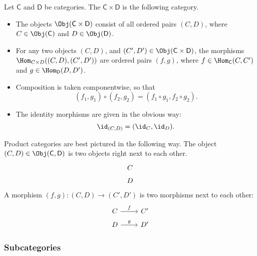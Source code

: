 \documentclass[main.tex]{subfiles}
\begin{document}
\begin{definition}
  \label{def:productcategory}
  Let $\mathsf{C}$ and $\mathsf{D}$ be categories. The  $\mathsf{C} \times \mathsf{D}$ is the following category.
  \begin{itemize}
    \item The objects $\Obj(\mathsf{C} \times \mathsf{D})$ consist of all ordered pairs $(C, D)$, where $C \in \Obj(\mathsf{C})$ and $D \in \Obj(\mathsf{D})$.

    \item For any two objects $(C, D)$, and $(C', D') \in \Obj(\mathsf{C} \times \mathsf{D})$,
      the morphisms $\Hom_{C \times D}((C, D), (C', D'))$ are ordered pairs $(f,g)$, where $f \in \Hom_{\mathsf{C}}(C, C')$ and $g \in \Hom_{\mathsf{D}}(D, D')$.

    \item Composition is taken componentwise, so that
      \begin{equation*}
        (f_{1}, g_{1}) \circ (f_{2},g_{2}) = (f_{1} \circ g_{1}, f_{2} \circ g_{2}).
      \end{equation*}

    \item The identity morphisms are given in the obvious way:
      \begin{equation*}
        \id_{(C,D)} = (\id_{C}, \id_{D}).
      \end{equation*}
  \end{itemize}
\end{definition}

Product categories are best pictured in the following way. The object $(C, D) \in \Obj(\mathsf{C}, \mathsf{D})$ is two objects right next to each other.
\begin{equation*}
  \begin{tikzcd}[row sep=tiny]
    C \\
    D
  \end{tikzcd}
\end{equation*}
A morphism $(f, g)\colon (C, D) \to (C', D')$ is two morphisms next to each other:
\begin{equation*}
  \begin{tikzcd}[row sep=tiny]
    C
    \arrow[r, "f"]
    & C'
    \\
    D
    \arrow[r, "g"]
    & D'
  \end{tikzcd}
\end{equation*}


\subsubsection{Subcategories}
\end{document}
